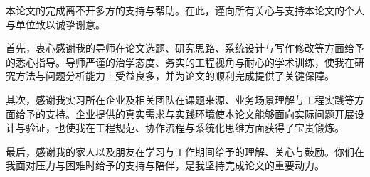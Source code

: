 \documentclass[macfonts,master,twoside,AutoFakeBold= {2}]{njuthesis}
\begin{document}

\begin{acknowledgement}
本论文的完成离不开多方的支持与帮助。在此，谨向所有关心与支持本论文的个人与单位致以诚挚谢意。

首先，衷心感谢我的导师在论文选题、研究思路、系统设计与写作修改等方面给予的悉心指导。导师严谨的治学态度、务实的工程视角与耐心的学术训练，使我在研究方法与问题分析能力上受益良多，并为论文的顺利完成提供了关键保障。

其次，感谢我实习所在企业及相关团队在课题来源、业务场景理解与工程实践等方面给予的支持。企业提供的真实需求与实践环境使本论文能够面向实际问题开展设计与验证，也使我在工程规范、协作流程与系统化思维方面获得了宝贵锻炼。

最后，感谢我的家人以及朋友在学习与工作期间给予的理解、关心与鼓励。你们在我面对压力与困难时给予的支持与陪伴，是我坚持完成论文的重要动力。

\end{acknowledgement}


\backmatter
\end{document}
